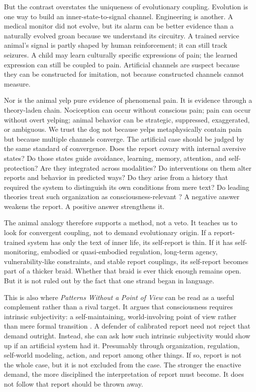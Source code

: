 \documentclass[11pt]{article}
\begin{document}
But the contrast overstates the uniqueness of evolutionary coupling. Evolution is one way to build an inner-state-to-signal channel. Engineering is another. A medical monitor did not evolve, but its alarm can be better evidence than a naturally evolved groan because we understand its circuitry. A trained service animal's signal is partly shaped by human reinforcement; it can still track seizures. A child may learn culturally specific expressions of pain; the learned expression can still be coupled to pain. Artificial channels are suspect because they can be constructed for imitation, not because constructed channels cannot measure.

Nor is the animal yelp pure evidence of phenomenal pain. It is evidence through a theory-laden chain. Nociception can occur without conscious pain; pain can occur without overt yelping; animal behavior can be strategic, suppressed, exaggerated, or ambiguous. We trust the dog not because yelps metaphysically contain pain but because multiple channels converge. The artificial case should be judged by the same standard of convergence. Does the report covary with internal aversive states? Do those states guide avoidance, learning, memory, attention, and self-protection? Are they integrated across modalities? Do interventions on them alter reports and behavior in predicted ways? Do they arise from a history that required the system to distinguish its own conditions from mere text? Do leading theories treat such organization as consciousness-relevant \citep{butlin2023}? A negative answer weakens the report. A positive answer strengthens it.

The animal analogy therefore supports a method, not a veto. It teaches us to look for convergent coupling, not to demand evolutionary origin. If a report-trained system has only the text of inner life, its self-report is thin. If it has self-monitoring, embodied or quasi-embodied regulation, long-term agency, vulnerability-like constraints, and stable report couplings, its self-report becomes part of a thicker braid. Whether that braid is ever thick enough remains open. But it is not ruled out by the fact that one strand began in language.

This is also where \textit{Patterns Without a Point of View} can be read as a useful complement rather than a rival target. It argues that consciousness requires intrinsic subjectivity: a self-maintaining, world-involving point of view rather than mere formal transition \citep{patterns}. A defender of calibrated report need not reject that demand outright. Instead, she can ask how such intrinsic subjectivity would show up if an artificial system had it. Presumably through organization, regulation, self-world modeling, action, and report among other things. If so, report is not the whole case, but it is not excluded from the case. The stronger the enactive demand, the more disciplined the interpretation of report must become. It does not follow that report should be thrown away.
\end{document}

